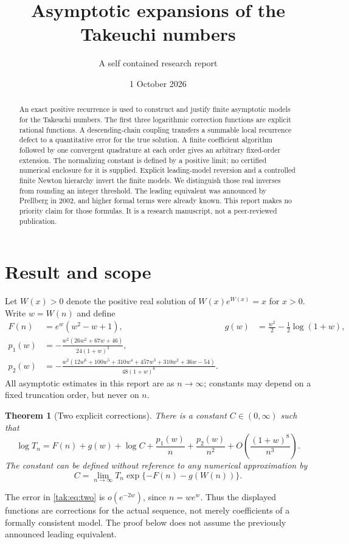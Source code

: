 \documentclass[11pt,letterpaper]{article}
\title{Asymptotic expansions of the Takeuchi numbers}
\author{A self contained research report}
\date{1 October 2026}
\newtheorem{theorem}{Theorem}[section]
\theoremstyle{remark}\newtheorem{remark}[theorem]{Remark}
\begin{document}
\maketitle
\begin{abstract}
An exact positive recurrence is used to construct and justify finite asymptotic models for the Takeuchi numbers. The first three logarithmic correction functions are explicit rational functions. A descending-chain coupling transfers a summable local recurrence defect to a quantitative error for the true solution. A finite coefficient algorithm followed by one convergent quadrature at each order gives an arbitrary fixed-order extension. The normalizing constant is defined by a positive limit; no certified numerical enclosure for it is supplied. Explicit leading-model reversion and a controlled finite Newton hierarchy invert the finite models. We distinguish those real inverses from rounding an integer threshold. The leading equivalent was announced by Prellberg in 2002, and higher formal terms were already known. This report makes no priority claim for those formulas. It is a research manuscript, not a peer-reviewed publication.
\end{abstract}
\setcounter{tocdepth}{1}\tableofcontents
\newpage

\section{Result and scope}\label{tak:sec:results}
Let $W(x)>0$ denote the positive real solution of $W(x)e^{W(x)}=x$ for $x>0$. Write $w=W(n)$ and define
\begin{align}
 F(n)&=e^w(w^2-w+1), &g(w)&=\frac{w^2}{2}-\frac12\log(1+w),\label{tak:eq:Fg}\\
 p_1(w)&=-\frac{w^2(26w^2+67w+46)}{24(1+w)^3},\label{tak:eq:p1}\\
 p_2(w)&=-\frac{w^2(12w^6+100w^5+310w^4+457w^3+310w^2+36w-54)}{48(1+w)^6}.\label{tak:eq:p2}
\end{align}
All asymptotic estimates in this report are as $n\to\infty$; constants may depend on a fixed truncation order, but never on $n$.

\begin{theorem}[Two explicit corrections]\label{tak:thm:two}
There is a constant $C\in(0,\infty)$ such that
\begin{equation}
 \log T_n=F(n)+g(w)+\log C+\frac{p_1(w)}n+\frac{p_2(w)}{n^2}
             +O\!\left(\frac{(1+w)^8}{n^3}\right).\label{tak:eq:two}
\end{equation}
The constant can be defined without reference to any numerical approximation by
\begin{equation}
 C=\lim_{n\to\infty}T_n\exp\{-F(n)-g(W(n))\}.\label{tak:eq:C}
\end{equation}
\end{theorem}
The error in \eqref{tak:eq:two} is $o(e^{-2w})$, since $n=we^w$. Thus the displayed functions are corrections for the actual sequence, not merely coefficients of a formally consistent model. The proof below does not assume the previously announced leading equivalent.
\end{document}
